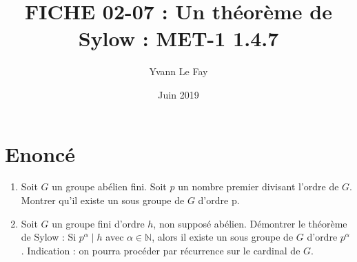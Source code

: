 \documentclass{article}
\begin{document}
\title{FICHE 02-07 : Un théorème de Sylow : MET-1 1.4.7}
\author{Yvann Le Fay}
\date{Juin 2019}
\maketitle
\section*{Enoncé}
\begin{enumerate}
\item Soit $G$ un groupe abélien fini. Soit $p$ un nombre premier divisant l'ordre de $G$. Montrer qu'il existe un sous groupe de $G$ d'ordre p. 
\item Soit $G$ un groupe fini d'ordre $h$, non supposé abélien. Démontrer le théorème de Sylow : Si $p^{\alpha}\mid h$ avec $\alpha \in \mathbb{N}$, alors il existe un sous groupe de $G$ d'ordre $p^{\alpha}$. Indication : on pourra procéder par récurrence sur le cardinal de $G$.
\end{enumerate}
\end{document}
